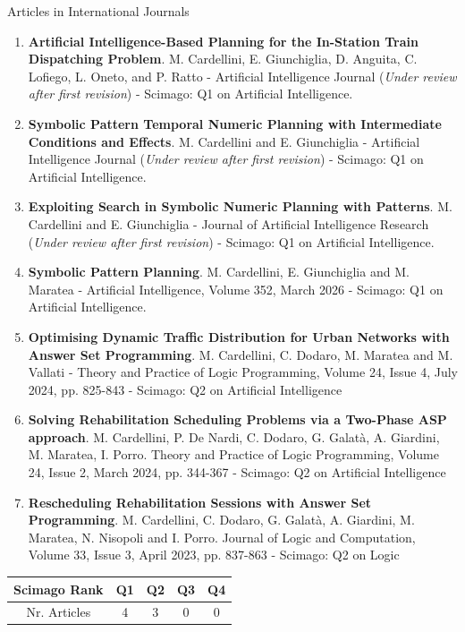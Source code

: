 \documentclass{resume} %
\begin{document}
\begin{rSection}{Articles in International Journals}
\begin{enumerate}[leftmargin=5mm]
	\item[J7] \textbf{Artificial Intelligence-Based Planning for the In-Station Train Dispatching Problem}. M. Cardellini, E. Giunchiglia, D. Anguita, C. Lofiego, L. Oneto, and P. Ratto - Artificial Intelligence Journal (\textit{Under review after first revision}) - Scimago: Q1 on Artificial Intelligence.
	\item[J6] \textbf{Symbolic Pattern Temporal Numeric Planning with Intermediate Conditions and Effects}. M. Cardellini and E. Giunchiglia - Artificial Intelligence Journal (\textit{Under review after first revision}) - Scimago: Q1 on Artificial Intelligence.
	\item[J5] \textbf{Exploiting Search in Symbolic Numeric Planning with Patterns}. M. Cardellini and E. Giunchiglia - Journal of Artificial Intelligence Research (\textit{Under review after first revision}) - Scimago: Q1 on Artificial Intelligence.
	\item[J4] \textbf{Symbolic Pattern Planning}. M. Cardellini, E. Giunchiglia and M. Maratea - Artificial Intelligence, Volume 352, March 2026 - Scimago: Q1 on Artificial Intelligence.
	\item[J3] \textbf{Optimising Dynamic Traffic Distribution for Urban Networks with Answer Set Programming}. M. Cardellini, C. Dodaro, M. Maratea and M. Vallati - Theory and Practice of Logic Programming,  Volume 24, Issue 4, July 2024, pp. 825-843 - Scimago: Q2 on Artificial Intelligence
	\item[J2] \textbf{Solving Rehabilitation Scheduling Problems via a Two-Phase ASP approach}. M. Cardellini, P. De Nardi, C. Dodaro, G. Galat\`a, A. Giardini, M. Maratea, I. Porro. Theory and Practice of Logic Programming, Volume 24, Issue 2, March 2024, pp. 344-367 - Scimago: Q2 on Artificial Intelligence
	\item[J1] \textbf{Rescheduling Rehabilitation Sessions with Answer Set Programming}. M. Cardellini, C. Dodaro, G. Galat\`a, A. Giardini, M. Maratea, N. Nisopoli and I. Porro. Journal of Logic and Computation, Volume 33, Issue 3, April 2023, pp. 837-863 - Scimago: Q2 on Logic
\end{enumerate}

\begin{center}
\begin{tabular}{|c||c|c|c|c|}
	\hline
Scimago Rank&Q1 & Q2 & Q3 & Q4 \\ \hline
Nr. Articles &4 & 3 & 0 & 0 \\ \hline
\end{tabular}%
\end{center}
\end{rSection}
 
\end{document}
